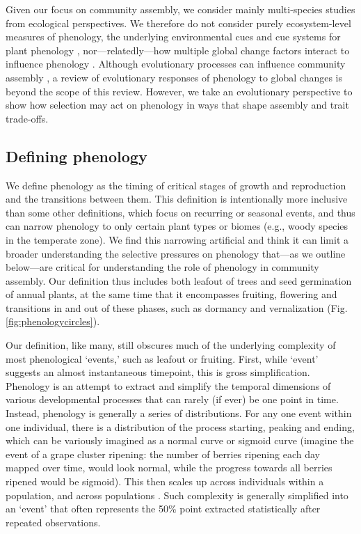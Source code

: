 \documentclass[11pt]{article}
\begin{document}
Given our focus on community assembly, we consider mainly multi-species studies from ecological perspectives. We therefore do not consider purely ecosystem-level measures of phenology, the underlying environmental cues and cue systems for plant phenology \citep[for a review see][]{chuine2017process}, nor---relatedly---how multiple global change factors interact to influence phenology \citep[e.g.][]{zhou2023climate}. Although evolutionary processes can influence community assembly \citep{cavender2019diversification}, a review of evolutionary responses of phenology to global changes is beyond the scope of this review. However, we take an evolutionary perspective to show how selection may act on phenology in ways that shape assembly and trait trade-offs.

\subsection*{Defining phenology} 

We define phenology as the timing of critical stages of growth and reproduction and the transitions between them. This definition is intentionally more inclusive than some other definitions, which focus on recurring or seasonal events, and thus can narrow phenology to only certain plant types or biomes (e.g., woody species in the temperate zone). We find this narrowing artificial and think it can limit a broader understanding the selective pressures on phenology that---as we outline below---are critical for understanding the role of phenology in community assembly. Our definition thus includes both leafout of trees and seed germination of annual plants, at the same time that it encompasses fruiting, flowering and transitions in and out of these phases, such as dormancy and vernalization (Fig. \ref{fig:phenologycircles}). 

Our definition, like many, still obscures much of the underlying complexity of most phenological `events,' such as leafout or fruiting. First, while `event' suggests an almost instantaneous timepoint, this is gross simplification. Phenology is an attempt to extract and simplify the temporal dimensions of various developmental processes that can rarely (if ever) be one point in time. Instead, phenology is generally a series of distributions. For any one event within one individual, there is a distribution of the process starting, peaking and ending, which can be variously imagined as a normal curve or sigmoid curve (imagine the event of a grape cluster ripening: the number of berries ripening each day mapped over time, would look normal, while the progress towards all berries ripened would be sigmoid). This then scales up across individuals within a population, and across populations \citep{inouye2019}. Such complexity is generally simplified into an `event' that often represents the 50\% point extracted statistically after repeated observations. 
\end{document}
